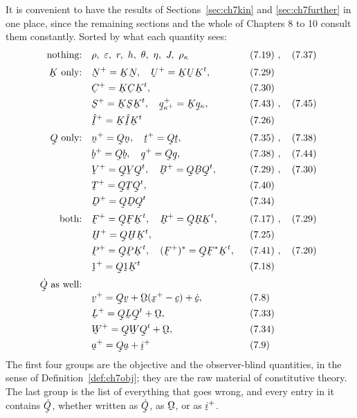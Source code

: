 It is convenient to have the results of Sections~\ref{sec:ch7kin} and
\ref{sec:ch7further} in one place, since the remaining sections and the
whole of Chapters 8 to 10 consult them constantly. Sorted by what each
quantity sees:
\[
\begin{aligned}
   \text{nothing:}&\quad
     \rho,\ \eps,\ r,\ h,\ \theta,\ \eta,\ J,\ \rho_{\kappa}
     &&\eqr{7.19},\ \eqr{7.37}\\[0.7mm]
   \bK\text{ only:}&\quad
     \bN^{+}=\bK\bN,\quad \bU^{+}=\bK\bU\bK^{t},
     &&\eqr{7.29}\\
   &\quad \bC^{+}=\bK\bC\bK^{t},
     &&\eqr{7.30}\\
   &\quad \bS^{+}=\bK\bS\bK^{t},\quad
     \bq^{+}_{\kappa^{+}}=\bK\bq_{\kappa},
     &&\eqr{7.43},\ \eqr{7.45}\\
   &\quad \hI^{+}=\bK\hI\bK^{t}
     &&\eqr{7.26}\\[0.7mm]
   \bQ\text{ only:}&\quad
     \bn^{+}=\bQ\bn,\quad \bt^{+}=\bQ\bt,
     &&\eqr{7.35},\ \eqr{7.38}\\
   &\quad \bb^{+}=\bQ\bb,\quad \bq^{+}=\bQ\bq,
     &&\eqr{7.38},\ \eqr{7.44}\\
   &\quad \bV^{+}=\bQ\bV\bQ^{t},\quad \bB^{+}=\bQ\bB\bQ^{t},
     &&\eqr{7.29},\ \eqr{7.30}\\
   &\quad \bT^{+}=\bQ\bT\bQ^{t},
     &&\eqr{7.40}\\
   &\quad \bD^{+}=\bQ\bD\bQ^{t}
     &&\eqr{7.34}\\[0.7mm]
   \text{both:}&\quad
     \bF^{+}=\bQ\bF\bK^{t},\quad \bR^{+}=\bQ\bR\bK^{t},
     &&\eqr{7.17},\ \eqr{7.29}\\
   &\quad \bH^{+}=\bQ\bH\bK^{t},
     &&\eqr{7.25}\\
   &\quad \bP^{+}=\bQ\bP\bK^{t},\quad
     (\bF^{+})^{*}=\bQ\bF^{*}\bK^{t},
     &&\eqr{7.41},\ \eqr{7.20}\\
   &\quad \shift^{+}=\bQ\shift\bK^{t}
     &&\eqr{7.18}\\[0.7mm]
   \dot\bQ\text{ as well:}&&&\\[-1mm]
   &\quad \bv^{+}=\bQ\bv+\bOm(\bx^{+}-\bc)+\dot\bc ,
     &&\eqr{7.8}\\
   &\quad \bL^{+}=\bQ\bL\bQ^{t}+\bOm,
     &&\eqr{7.33}\\
   &\quad \bW^{+}=\bQ\bW\bQ^{t}+\bOm,
     &&\eqr{7.34}\\
   &\quad \ba^{+}=\bQ\ba+\vek{i}^{+}
     &&\eqr{7.9}
\end{aligned}
\]
The first four groups are the objective and the observer-blind
quantities, in the sense of Definition~\ref{def:ch7obj}; they are the raw
material of constitutive theory. The last group is the list of everything
that goes wrong, and every entry in it contains $\dot\bQ$, whether
written as $\dot\bQ$, as $\bOm$, or as $\vek{i}^{+}$.

